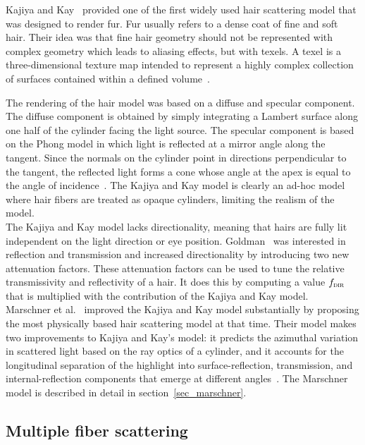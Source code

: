 \documentclass[11pt,a4paper]{report}
\begin{document}
Kajiya and Kay~\cite{kajiya} provided one of the first widely used hair scattering model that was designed to render fur. Fur usually refers to a  dense coat of fine and soft hair. Their idea was that fine hair geometry should not be represented with complex geometry which leads to aliasing effects, but with texels. A texel is a three-dimensional texture map intended to represent a highly complex collection of surfaces contained within a defined volume~\cite{kajiya}.

The rendering of the hair model was based on a diffuse and specular component. The diffuse component is obtained by simply integrating a Lambert surface along one half of the cylinder facing the light source. The specular component is based on the Phong model in which light is reflected at a mirror angle along the tangent. Since the normals on the cylinder point in directions perpendicular to the tangent, the reflected light forms a cone whose angle at the apex is equal to the angle of incidence~\cite{kajiya}. The Kajiya and Kay model is clearly an ad-hoc model where hair fibers are treated as opaque cylinders, limiting the realism of the model.\\

The Kajiya and Kay model lacks directionality, meaning that hairs are fully lit independent on the light direction or eye position. Goldman~\cite{goldman} was interested in reflection and transmission and increased directionality by introducing two new attenuation factors. These attenuation factors can be used to tune the relative transmissivity and reflectivity of a hair. It does this by computing a value $f_{\textsc{dir}}$ that is multiplied with the contribution of the Kajiya and Kay model.\\

Marschner et al.~\cite{marschner} improved the Kajiya and Kay model substantially by proposing the most physically based hair scattering model at that time. Their model makes two improvements to Kajiya and Kay's model: it predicts the azimuthal variation in scattered light based on the ray optics of a cylinder, and it accounts for the longitudinal separation of the highlight into surface-reflection, transmission, and internal-reflection components that emerge at different angles~\cite{hadap}. The Marschner model is described in detail in section~\ref{sec_marschner}.


\subsection{Multiple fiber scattering}
\end{document}
